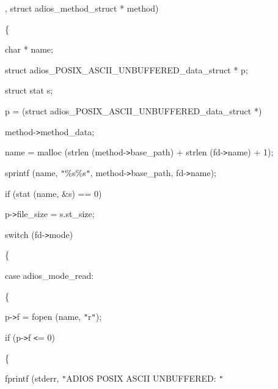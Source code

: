 \vspace{10pt}
\parindent=133pt
{\color{color02} , struct adios\_method\_struct * method)}

\vspace{10pt}
\parindent=0pt
\{

\vspace{10pt}
\parindent=14pt
char * name;

\vspace{10pt}
struct adios\_POSIX\_ASCII\_UNBUFFERED\_data\_struct * p;

\vspace{10pt}
\parindent=28pt
struct stat s;

\vspace{10pt}
\parindent=14pt
p = (struct adios\_POSIX\_ASCII\_UNBUFFERED\_data\_struct *)

\vspace{10pt}
\parindent=208pt
method-\texttt{>}method\_data;

\vspace{10pt}
\parindent=14pt
name = malloc (strlen (method-\texttt{>}base\_path) + strlen (fd-\texttt{>}name) 
+ 1);

\vspace{10pt}
sprintf (name, \texttt{"}\%s\%s\texttt{"}, method-\texttt{>}base\_path, fd-\texttt{>}name);

\vspace{10pt}
\parindent=28pt
if (stat (name, \&s) == 0)

\vspace{10pt}
p-\texttt{>}file\_size = s.st\_size;

\vspace{10pt}
\parindent=43pt
switch (fd-\texttt{>}mode)

\vspace{10pt}
\parindent=14pt
\{

\vspace{10pt}
\parindent=28pt
case adios\_mode\_read:

\vspace{10pt}
\{

\vspace{10pt}
\parindent=72pt
p-\texttt{>}f = fopen (name, \texttt{"}r\texttt{"});

\vspace{10pt}
\parindent=43pt
if (p-\texttt{>}f \texttt{<}= 0)

\vspace{10pt}
\{

\vspace{10pt}
\parindent=100pt
fprintf (stderr, \texttt{"}ADIOS POSIX ASCII UNBUFFERED: \texttt{"}


